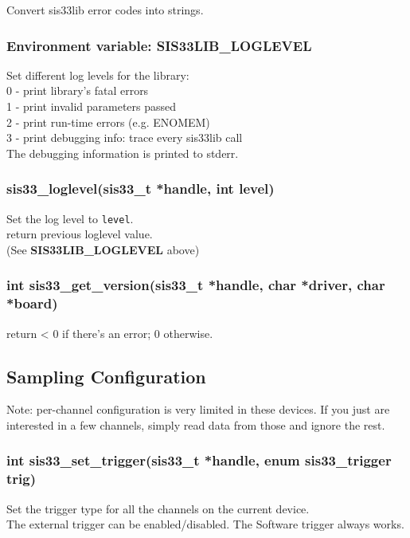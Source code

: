 \documentclass[12pt,a4paper]{article}
\begin{document}
Convert sis33lib error codes into strings.

\subsubsection*{Environment variable: SIS33LIB\_LOGLEVEL}
\label{sec-2.2.2}

Set different log levels for the library: \\
0 - print library's fatal errors \\
1 - print invalid parameters passed \\
2 - print run-time errors (e.g. ENOMEM) \\
3 - print debugging info: trace every sis33lib call \\
The debugging information is printed to stderr.

\subsubsection*{sis33\_loglevel(sis33\_t *handle, int level)}
\label{sec-2.2.3}

Set the log level to \verb~level~. \\
return previous loglevel value. \\
(See \textbf{SIS33LIB\_LOGLEVEL} above)

\subsubsection*{int sis33\_get\_version(sis33\_t *handle, char *driver,
  char *board)}
\label{sec-2.2.4}

return < 0 if there's an error; 0 otherwise.

\subsection*{Sampling Configuration}
\label{sec-2.3}

Note: per-channel configuration is very limited in these devices. If
you just are interested in a few channels, simply read data from those
and ignore the rest. \\

\subsubsection*{int sis33\_set\_trigger(sis33\_t *handle,
  enum sis33\_trigger trig)}
\label{sec-2.3.1}

Set the trigger type for all the channels on the current device. \\
The external trigger can be enabled/disabled. The Software trigger always
works.
\end{document}
